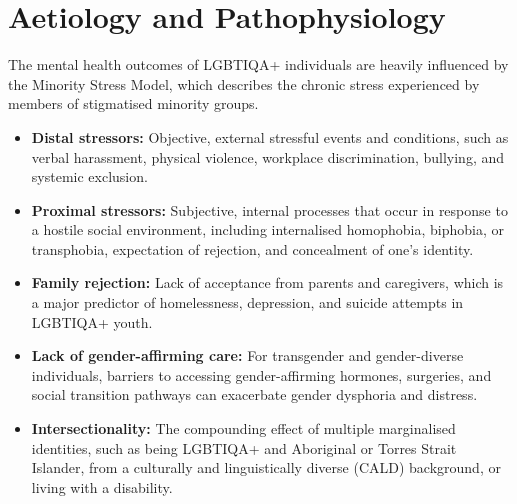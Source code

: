 \section*{Aetiology and Pathophysiology}
The mental health outcomes of LGBTIQA+ individuals are heavily influenced by the Minority Stress Model, which describes the chronic stress experienced by members of stigmatised minority groups.
\begin{itemize}
    \item \textbf{Distal stressors:} Objective, external stressful events and conditions, such as verbal harassment, physical violence, workplace discrimination, bullying, and systemic exclusion.
    \item \textbf{Proximal stressors:} Subjective, internal processes that occur in response to a hostile social environment, including internalised homophobia, biphobia, or transphobia, expectation of rejection, and concealment of one's identity.
    \item \textbf{Family rejection:} Lack of acceptance from parents and caregivers, which is a major predictor of homelessness, depression, and suicide attempts in LGBTIQA+ youth.
    \item \textbf{Lack of gender-affirming care:} For transgender and gender-diverse individuals, barriers to accessing gender-affirming hormones, surgeries, and social transition pathways can exacerbate gender dysphoria and distress.
    \item \textbf{Intersectionality:} The compounding effect of multiple marginalised identities, such as being LGBTIQA+ and Aboriginal or Torres Strait Islander, from a culturally and linguistically diverse (CALD) background, or living with a disability.
\end{itemize}

